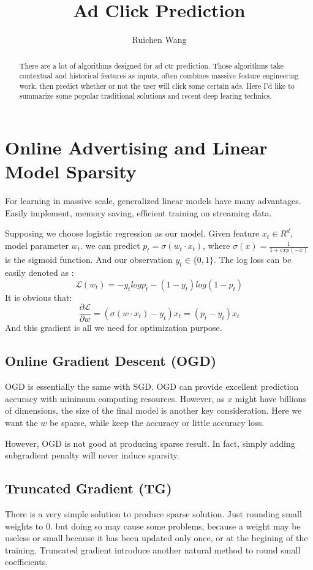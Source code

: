 \documentclass{article}
\author{Ruichen Wang}
\title{Ad Click Prediction}
\begin{document}
\maketitle
\begin{abstract}
There are a lot of algorithms designed for ad ctr prediction. Those algorithms take contextual and historical features as inputs, often combines massive feature engineering work, then predict whether or not the user will click some certain ads. Here I'd like to summarize some popular traditional solutions and recent deep learing technics.
\end{abstract}

\tableofcontents
\section{Online Advertising and Linear Model Sparsity}
For learning in massive scale, generalized linear models have many advantages.  Easily implement, memory saving, efficient training on streaming data.

Supposing we choose logistic regression as our model. Given feature $x_{t} \in R^{d}$, model parameter $w_{t}$. we can predict $p_{t}=\sigma (w_{t} \cdot  x_{t})$, where $\sigma(x)=\frac{1}{1+exp(-x)}$ is the sigmoid function. And our observation $y_{t} \in \{0,1\}$. The log loss can be easily denoted as :
$$\mathcal{L}(w_{t})=-y_{t}log p_{t}-(1-y_{t})log(1-p_{t})$$
It is obvious that:
$$\frac{\partial \mathcal{L}}{\partial w}= (\sigma(w \cdot x_{t})-y_{t}) x_{t} = (p_{t}-y_{t})x_{t}$$
And this gradient is all we need for optimization purpose. 
\subsection{Online Gradient Descent (OGD)}
OGD is essentially the same with SGD. OGD can provide excellent prediction accuracy with minimum computing resources. However, as $x$ might have billions of dimensions, the size of the final model is another key consideration. Here we want the $w$ be sparse, while keep the accuracy or little accuracy loss.

However, OGD is not good at producing sparse result. In fact, simply adding subgradient penalty will never induce sparsity.
\subsection{Truncated Gradient (TG)}
There is a very simple solution to produce sparse solution. Just rounding small weights to 0. but doing so may cause some problems, because a weight may be useless or small because it has been updated only once, or at the begining of the training. 
Truncated gradient\cite{DBLP:journals/jmlr/DuchiHS11,DBLP:journals/jmlr/LangfordLZ09} introduce another natural method to round small coefficients.
\end{document}
